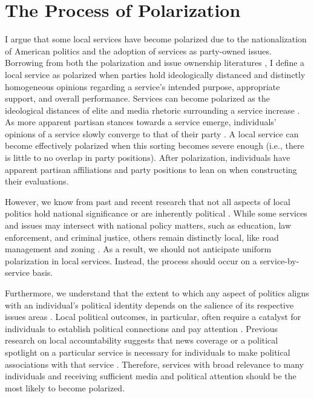 \section{The Process of Polarization}
I argue that some local services have become polarized due to the nationalization of American politics \citep{hopkinsIncreasinglyUnitedStates2018} and the adoption of services as party-owned issues. Borrowing from both the polarization \citep[e.g.,][]{levenduskyPartisanSortHow2010,sinclair2006party} and issue ownership literatures \citep[e.g.,][]{petrocikIssueOwnershipPresidential1996,egan2013partisan,green2004partisan}, I define a local service as polarized when parties hold ideologically distanced and distinctly homogeneous opinions regarding a service's intended purpose, appropriate support, and overall performance. Services can become polarized as the ideological distances of elite and media rhetoric surrounding a service increase \citep{prior2013,fiorinaPoliticalPolarizationAmerican2008,wilsonPolarizationContemporaryPolitical2020}. As more apparent partisan stances towards a service emerge, individuals' opinions of a service slowly converge to that of their party \citep{walgraveIssueOwnershipStability2009,walgravedimissue2012,craigWhoOwnsWhat2020}. A local service can become effectively polarized when this sorting becomes severe enough (i.e., there is little to no overlap in party positions). After polarization, individuals have apparent partisan affiliations and party positions to lean on when constructing their evaluations.

However, we know from past and recent research that not all aspects of local politics hold national significance or are inherently political \citep{anziaPartyIdeologyAmerican2021}. While some services and issues may intersect with national policy matters, such as education, law enforcement, and criminal justice, others remain distinctly local, like road management and zoning \citep{thompsonHowPartisanLocal2020,jensenCityLimitsPartisan2021,sancesWhenVotersMatter2021}. As a result, we should not anticipate uniform polarization in local services. Instead, the process should occur on a service-by-service basis.

Furthermore, we understand that the extent to which any aspect of politics aligns with an individual's political identity depends on the salience of its respective issues areas \citep{belangerIssueSalienceIssue2008a}. Local political outcomes, in particular, often require a catalyst for individuals to establish political connections and pay attention \citep{mooreMotivationsMobilizationComparing2022,nuamahCloseHomePlaceBased2021}. Previous research on local accountability suggests that news coverage or a political spotlight on a particular service is necessary for individuals to make political associations with that service \citep{paysonWhenAreLocal2017,berryAccountabilityLocalElections2007,debenedictis-kessnerStrategicGovernmentCommunication2022}. Therefore, services with broad relevance to many individuals and receiving sufficient media and political attention should be the most likely to become polarized. 

